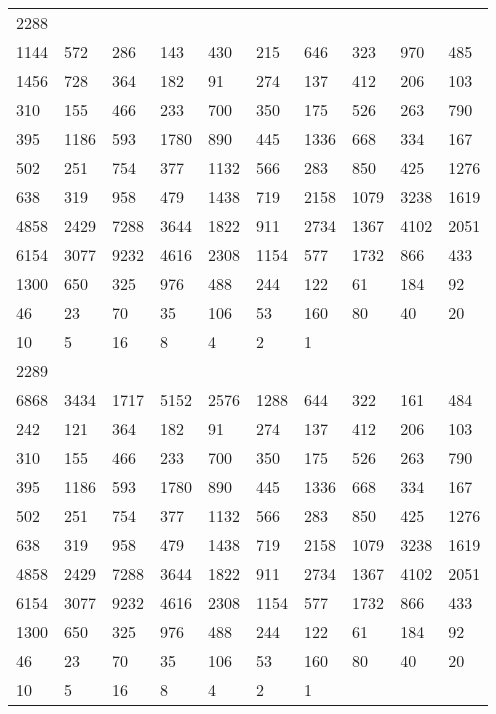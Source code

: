 \begin{longtable}{*{10}{l}}
2288&&&&&&&&&\\
1144& 572& 286& 143& 430& 215& 646& 323& 970& 485\\
1456& 728& 364& 182& 91& 274& 137& 412& 206& 103\\
310& 155& 466& 233& 700& 350& 175& 526& 263& 790\\
395& 1186& 593& 1780& 890& 445& 1336& 668& 334& 167\\
502& 251& 754& 377& 1132& 566& 283& 850& 425& 1276\\
638& 319& 958& 479& 1438& 719& 2158& 1079& 3238& 1619\\
4858& 2429& 7288& 3644& 1822& 911& 2734& 1367& 4102& 2051\\
6154& 3077& 9232& 4616& 2308& 1154& 577& 1732& 866& 433\\
1300& 650& 325& 976& 488& 244& 122& 61& 184& 92\\
46& 23& 70& 35& 106& 53& 160& 80& 40& 20\\
10& 5& 16& 8& 4& 2& 1& \\

2289&&&&&&&&&\\
6868& 3434& 1717& 5152& 2576& 1288& 644& 322& 161& 484\\
242& 121& 364& 182& 91& 274& 137& 412& 206& 103\\
310& 155& 466& 233& 700& 350& 175& 526& 263& 790\\
395& 1186& 593& 1780& 890& 445& 1336& 668& 334& 167\\
502& 251& 754& 377& 1132& 566& 283& 850& 425& 1276\\
638& 319& 958& 479& 1438& 719& 2158& 1079& 3238& 1619\\
4858& 2429& 7288& 3644& 1822& 911& 2734& 1367& 4102& 2051\\
6154& 3077& 9232& 4616& 2308& 1154& 577& 1732& 866& 433\\
1300& 650& 325& 976& 488& 244& 122& 61& 184& 92\\
46& 23& 70& 35& 106& 53& 160& 80& 40& 20\\
10& 5& 16& 8& 4& 2& 1& \\


\end{longtable}
